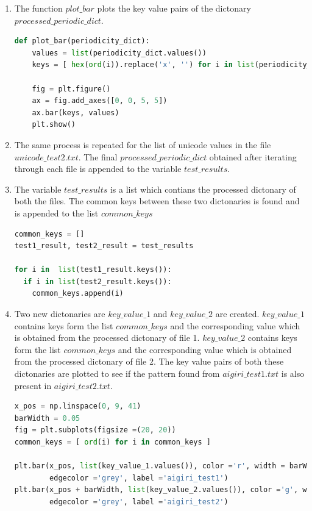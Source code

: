 \begin{enumerate}[label=\thesection.\arabic*.,ref=\thesection.\theenumi]
\item The function $plot\_bar$ plots the key value pairs of the dictonary $processed\_periodic\_dict$.
\begin{lstlisting}[language=Python]
def plot_bar(periodicity_dict):
    values = list(periodicity_dict.values())
    keys = [ hex(ord(i)).replace('x', '') for i in list(periodicity_dict.keys()) ]

    fig = plt.figure()
    ax = fig.add_axes([0, 0, 5, 5])
    ax.bar(keys, values)
    plt.show()
\end{lstlisting}

\item The same process is repeated for the list of unicode values in the file $unicode\_test2.txt$. The final $processed\_periodic\_dict$ obtained after iterating through each file is appended to the variable $test\_results$.

\item The variable $test\_results$ is a list which contians the processed dictonary of both the files. The common keys between these two dictonaries is found and is appended to the list $common\_keys$ 
\begin{lstlisting}[language=Python]
common_keys = []
test1_result, test2_result = test_results

for i in  list(test1_result.keys()):
  if i in list(test2_result.keys()):
    common_keys.append(i)
\end{lstlisting}

\item Two new dictonaries are $key\_value\_1$ and $key\_value\_2$ are created. $key\_value\_1$ contains keys form the list $common\_keys$ and the corresponding value which is obtained from the processed dictonary of file 1.  $key\_value\_2$ contains keys form the list $common\_keys$ and the corresponding value which is obtained from the processed dictonary of file 2. The key value pairs of both these dictonaries are plotted to see if the pattern found from $aigiri\_test1.txt$ is also present in $aigiri\_test2.txt$.
\begin{lstlisting}[language=Python]
x_pos = np.linspace(0, 9, 41)
barWidth = 0.05
fig = plt.subplots(figsize =(20, 20)) 
common_keys = [ ord(i) for i in common_keys ]

plt.bar(x_pos, list(key_value_1.values()), color ='r', width = barWidth, 
		edgecolor ='grey', label ='aigiri_test1') 
plt.bar(x_pos + barWidth, list(key_value_2.values()), color ='g', width = barWidth, 
		edgecolor ='grey', label ='aigiri_test2') 


\end{lstlisting}
\end{enumerate}
